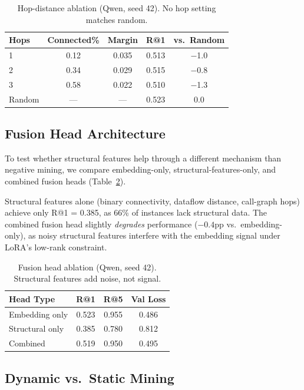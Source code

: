 \documentclass[11pt,a4paper]{article}
\begin{document}
\begin{table}[t]
\centering
\small
\caption{Hop-distance ablation (Qwen, seed 42). No hop setting matches random.}
\label{tab:hops}
\begin{tabular}{lcccc}
\toprule
Hops & Connected\% & Margin & R@1 & vs.\ Random \\
\midrule
1      & 0.12 & 0.035 & 0.513 & $-$1.0 \\
2      & 0.34 & 0.029 & 0.515 & $-$0.8 \\
3      & 0.58 & 0.022 & 0.510 & $-$1.3 \\
Random & ---  & ---   & 0.523 & 0.0 \\
\bottomrule
\end{tabular}
\end{table}

\subsection{Fusion Head Architecture}

To test whether structural features help through a different mechanism than negative mining, we compare embedding-only, structural-features-only, and combined fusion heads (Table~\ref{tab:fusion}).

Structural features alone (binary connectivity, dataflow distance, call-graph hops) achieve only R@1 = 0.385, as 66\% of instances lack structural data.
The combined fusion head slightly \emph{degrades} performance ($-0.4$pp vs.\ embedding-only), as noisy structural features interfere with the embedding signal under LoRA's low-rank constraint.

\begin{table}[t]
\centering
\small
\caption{Fusion head ablation (Qwen, seed 42). Structural features add noise, not signal.}
\label{tab:fusion}
\begin{tabular}{lccc}
\toprule
Head Type & R@1 & R@5 & Val Loss \\
\midrule
Embedding only    & 0.523 & 0.955 & 0.486 \\
Structural only   & 0.385 & 0.780 & 0.812 \\
Combined          & 0.519 & 0.950 & 0.495 \\
\bottomrule
\end{tabular}
\end{table}

\subsection{Dynamic vs.\ Static Mining}
\end{document}
